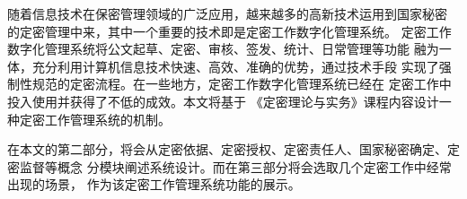 随着信息技术在保密管理领域的广泛应用，越来越多的高新技术运用到国家秘密
的定密管理中来，其中一个重要的技术即是定密工作数字化管理系统。
定密工作数字化管理系统将公文起草、定密、审核、签发、统计、日常管理等功能
融为一体，充分利用计算机信息技术快速、高效、准确的优势，通过技术手段
实现了强制性规范的定密流程。在一些地方，定密工作数字化管理系统已经在
定密工作中投入使用并获得了不低的成效\cite{zhejiang:xianxing}。本文将基于
《定密理论与实务》课程内容设计一种定密工作管理系统的机制。

在本文的第二部分，将会从定密依据、定密授权、定密责任人、国家秘密确定、定密监督等概念
分模块阐述系统设计。而在第三部分将会选取几个定密工作中经常出现的场景，
作为该定密工作管理系统功能的展示。